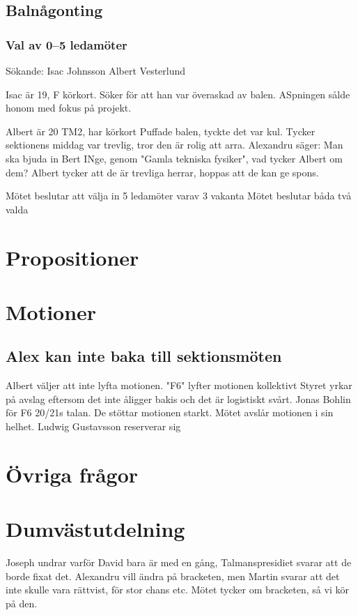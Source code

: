 \documentclass{sektionsmote}
\begin{document}
\subsection{Balnågonting}

\subsubsection{Val av 0--5 ledamöter}
Sökande:
Isac Johnsson
Albert Vesterlund

Isac är 19, F körkort.
Söker för att han var överaskad av balen. ASpningen sålde honom med fokus på projekt.

Albert är 20 TM2, har körkort
Puffade balen, tyckte det var kul.
Tycker sektionens middag var trevlig, tror den är rolig att arra.
Alexandru säger: Man ska bjuda in Bert INge, genom "Gamla tekniska fysiker", vad tycker Albert om dem?
Albert tycker att de är trevliga herrar, hoppas att de kan ge spons.

Mötet beslutar att välja in 5 ledamöter varav 3 vakanta
Mötet beslutar båda två valda

\section{Propositioner}

\section{Motioner}

\subsection{Alex kan inte baka till sektionsmöten}
Albert väljer att inte lyfta motionen.
"F6" lyfter motionen kollektivt
Styret yrkar på avslag eftersom det inte åligger bakis och det är logistiskt svårt.
Jonas Bohlin för F6 20/21s talan. De stöttar motionen starkt.
Mötet avslår motionen i sin helhet.
Ludwig Gustavsson reserverar sig

\section{Övriga frågor}

\section{Dumvästutdelning}
Joseph undrar varför David bara är med en gång, Talmanspresidiet svarar att de borde fixat det.
Alexandru vill ändra på bracketen, men Martin svarar att det inte skulle vara rättvist, för stor chans etc.
Mötet tycker om bracketen, så vi kör på den.
\end{document}
